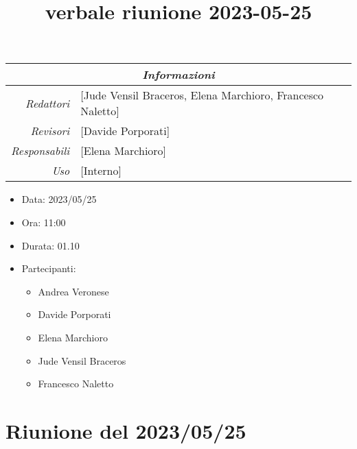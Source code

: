 \documentclass[12pt]{article}
\begin{document}
\graphicspath{ {../../templates/img} }

\title{verbale riunione 2023-05-25}

\firstPage
\maketitle

\begin{center}
\begin{tabular}{r | l}
    \multicolumn{2}{c}{\textit{Informazioni}}\\
    \hline
    
        \textit{Redattori} &
        [Jude Vensil Braceros, Elena Marchioro, Francesco Naletto]\makecell{}\\
    
        \textit{Revisori} &
        [Davide Porporati]\makecell{}\\
        \textit{Responsabili} &
        [Elena Marchioro]\makecell{}\\
            \textit{Uso} & 
            [Interno]\makecell{}\\
\end{tabular}
    \begin{itemize}
    \item[] Data: 2023/05/25
    \item[] Ora: 11:00
    \item[] Durata: 01.10
    \item[] Partecipanti:
    \begin{itemize}
    \item[] Andrea Veronese
    \item[] Davide Porporati
    \item[] Elena Marchioro
    \item[] Jude Vensil Braceros
    \item[] Francesco Naletto
    \end{itemize}
    \end{itemize}
\end{center}


\tableofcontents
\printindex 
\section{Riunione del 2023/05/25}
\end{document}
